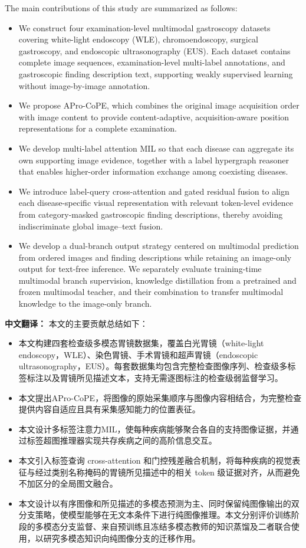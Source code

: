 \documentclass[Afour,sagev,times]{sagej}
\begin{document}
The main contributions of this study are summarized as follows:
\begin{itemize}
    \item We construct four examination-level multimodal gastroscopy datasets covering white-light endoscopy (WLE), chromoendoscopy, surgical gastroscopy, and endoscopic ultrasonography (EUS). Each dataset contains complete image sequences, examination-level multi-label annotations, and gastroscopic finding description text, supporting weakly supervised learning without image-by-image annotation.
    \item We propose APro-CoPE, which combines the original image acquisition order with image content to provide content-adaptive, acquisition-aware position representations for a complete examination.
    \item We develop multi-label attention MIL so that each disease can aggregate its own supporting image evidence, together with a label hypergraph reasoner that enables higher-order information exchange among coexisting diseases.
    \item We introduce label-query cross-attention and gated residual fusion to align each disease-specific visual representation with relevant token-level evidence from category-masked gastroscopic finding descriptions, thereby avoiding indiscriminate global image--text fusion.
    \item We develop a dual-branch output strategy centered on multimodal prediction from ordered images and finding descriptions while retaining an image-only output for text-free inference. We separately evaluate training-time multimodal branch supervision, knowledge distillation from a pretrained and frozen multimodal teacher, and their combination to transfer multimodal knowledge to the image-only branch.
\end{itemize}

\noindent\textbf{中文翻译：}
本文的主要贡献总结如下：
\begin{itemize}
    \item 本文构建四套检查级多模态胃镜数据集，覆盖白光胃镜（white-light endoscopy，WLE）、染色胃镜、手术胃镜和超声胃镜（endoscopic ultrasonography，EUS）。每套数据集均包含完整检查图像序列、检查级多标签标注以及胃镜所见描述文本，支持无需逐图标注的检查级弱监督学习。
    \item 本文提出APro-CoPE，将图像的原始采集顺序与图像内容相结合，为完整检查提供内容自适应且具有采集感知能力的位置表征。
    \item 本文设计多标签注意力MIL，使每种疾病能够聚合各自的支持图像证据，并通过标签超图推理器实现共存疾病之间的高阶信息交互。
    \item 本文引入标签查询 cross-attention 和门控残差融合机制，将每种疾病的视觉表征与经过类别名称掩码的胃镜所见描述中的相关 token 级证据对齐，从而避免不加区分的全局图文融合。
    \item 本文设计以有序图像和所见描述的多模态预测为主、同时保留纯图像输出的双分支策略，使模型能够在无文本条件下进行纯图像推理。本文分别评价训练阶段的多模态分支监督、来自预训练且冻结多模态教师的知识蒸馏及二者联合使用，以研究多模态知识向纯图像分支的迁移作用。
\end{itemize}
\end{document}

